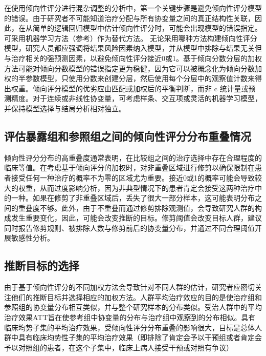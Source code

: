 \documentclass[
  chinese-hans,
  letterpaper,
  DIV=11,
  numbers=noendperiod]{scrreprt}
\begin{document}
在使用倾向性评分进行混杂调整的分析中，第一个关键步骤是避免倾向性评分模型的错误。由于研究者不可能知道治疗分配与所有协变量之间的真正结构性关联，因此，在从简单的逻辑回归模型中估计倾向性评分时，可能会出现模型的错误指定。可采用机器学习方法（参考）作为替代方法。
无论采用哪种方法构建倾向性评分模型，研究人员都应强调将结果风险因素纳入模型，并从模型中排除与结果无关但与治疗相关的强预测因素，以避免倾向性评分接近0或1。基于倾向分数分层的加权方法可能对倾向分数模型的错误指定更为稳健，因为它可以被概念化为倾向分数加权的半参数模型，只使用分数来创建分层，然后使用每个分层中的观察值计数来得出权重。倾向评分模型的优劣应由匹配或加权后的平衡判断，而非
c
统计量或预测精度。对于连续或非线性协变量，可考虑样条、交互项或灵活的机器学习模型，并保持模型选择与结局分析相对独立。

\subsection{评估暴露组和参照组之间的倾向性评分分布重叠情况}\label{ux8bc4ux4f30ux66b4ux9732ux7ec4ux548cux53c2ux7167ux7ec4ux4e4bux95f4ux7684ux503eux5411ux6027ux8bc4ux5206ux5206ux5e03ux91cdux53e0ux60c5ux51b5}

倾向性评分分布的高重叠度通常表明，在比较组之间的治疗选择中存在合理程度的临床等值。在考虑基于倾向评分的加权时，对非重叠区域进行修剪以确保限制在患者接受任何一种治疗的概率不为零的区域尤为重要。接近0或1的概率可能会导致较大的权重，从而过度影响分析，因为非典型情况下的患者肯定会接受这两种治疗中的一种。如果在修剪了非重叠区域后，丢失了很大一部分样本，这可能表明分布之间的重叠度不够。此外，由于不重叠而通过修剪排除观测值，会导致研究人群的构成发生重要变化，因此，可能会改变推断的目标。修剪阈值会改变目标人群，建议同时报告修剪规则、被排除人数与修剪前后的协变量分布，并通过不同合理阈值开展敏感性分析。

\subsection{推断目标的选择}\label{ux63a8ux65adux76eeux6807ux7684ux9009ux62e9}

由于基于倾向性评分的不同加权方法会导致针对不同人群的估计，研究者应密切关注他们的推断目标并选择相应的加权方法。人群平均治疗效应的目的是使治疗组和参照组的协变量分布相互类似，并与整个研究样本的分布类似。受治人群中的平均治疗效果ATT旨在使参考组中协变量的分布与治疗组中观察到的分布相似。具有临床均势子集的平均治疗效果，受倾向性评分分布重叠的影响很大，目标是总体人群中具有临床均势性子集的平均治疗效果（即排除了肯定会予以干预组或者肯定会予以对照组的患者，在这个子集中，临床上病人接受干预或对照有争议）
\end{document}
